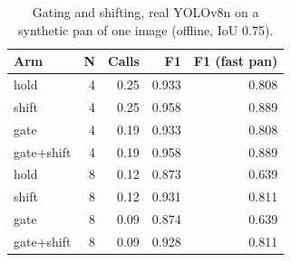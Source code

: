 \begin{table}[t]
\centering\small
\caption{Gating and shifting, real YOLOv8n on a synthetic pan of one image (offline, IoU 0.75).}\label{tab:gating-synth}
\begin{tabular}{lrrrr}
\toprule
Arm & N & Calls & F1 & F1 (fast pan) \\
\midrule
hold & 4 & 0.25 & 0.933 & 0.808 \\
shift & 4 & 0.25 & 0.958 & 0.889 \\
gate & 4 & 0.19 & 0.933 & 0.808 \\
gate+shift & 4 & 0.19 & 0.958 & 0.889 \\
hold & 8 & 0.12 & 0.873 & 0.639 \\
shift & 8 & 0.12 & 0.931 & 0.811 \\
gate & 8 & 0.09 & 0.874 & 0.639 \\
gate+shift & 8 & 0.09 & 0.928 & 0.811 \\
\bottomrule
\end{tabular}
\end{table}
